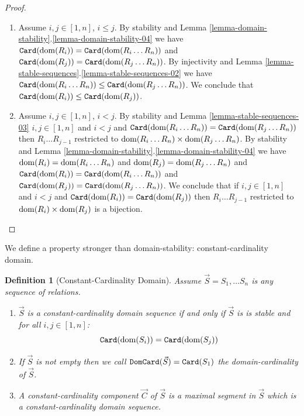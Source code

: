 \documentclass{lmcs}
\newtheorem{definition}[theorem]{Definition}
\begin{document}
\begin{proof}
\begin{enumerate}

\item
Assume $i,j \in [1,n]$, $i \le j$. By stability and
Lemma \ref{lemma-domain-stability}.\ref{lemma-domain-stability-04}
we have
${\tt Card}({\rm dom}(R_i)) = {\tt Card}({\rm dom}(R_i \ldots R_n))$ and
${\tt Card}({\rm dom}(R_j)) = {\tt Card}({\rm dom}(R_j \ldots R_n))$.
By injectivity and Lemma \ref{lemma-stable-sequences}.\ref{lemma-stable-sequences-02}  
we have 
${\tt Card}({\rm dom}(R_i \ldots R_n)) \le {\tt Card}({\rm dom}(R_j \ldots R_n))$.
We conclude that 
${\tt Card}({\rm dom}(R_i)) \le {\tt Card}({\rm dom}(R_j))$.

\item
Assume $i,j \in [1,n]$, $i < j$. By stability and Lemma \ref{lemma-stable-sequences-03}
$i, j \in[1,n]$ and $i < j$ and ${\tt Card}({\rm dom}(R_i \ldots R_n)) = {\tt Card}({\rm dom}(R_j \ldots R_n))$
then $R_i \ldots R_{j-1}$ restricted to ${\rm dom}(R_i \ldots R_n) \times {\rm dom}(R_j \ldots R_n)$.
By stability and
Lemma \ref{lemma-domain-stability}.\ref{lemma-domain-stability-04}
we have
${\rm dom}(R_i) = {\rm dom}(R_i \ldots R_n)$ and
${\rm dom}(R_j) = {\rm dom}(R_j \ldots R_n)$ and
${\tt Card}({\rm dom}(R_i)) = {\tt Card}({\rm dom}(R_i \ldots R_n))$ and
${\tt Card}({\rm dom}(R_j)) = {\tt Card}({\rm dom}(R_j \ldots R_n))$.
We conclude that if 
 $i, j \in[1,n]$ and $i < j$ and ${\tt Card}({\rm dom}(R_i)) = {\tt Card}({\rm dom}(R_j))$
then $R_i \ldots R_{j-1}$ restricted to ${\rm dom}(R_i) \times {\rm dom}(R_j)$
is a bijection.
\end{enumerate}

\end{proof}


We define a property stronger than domain-stability: constant-cardinality domain.


\begin{definition}[Constant-Cardinality Domain]
Assume $\vec{S}=S_1, \ldots S_n$ is any sequence of relations.
\begin{enumerate}

\item
$\vec{S}$ is a constant-cardinality domain sequence if and only if $\vec{S}$ is is stable
and for all $i,j \in [1,n]$:
$$
{\tt Card}({\rm dom}(S_i)) = {\tt Card}({\rm dom}(S_j))
$$

\item
If $\vec{S}$ is not empty then we call ${\tt DomCard}(\vec{S}) = {\tt Card}(S_1)$ 
the domain-cardinality of $\vec{S}$.

\item
A constant-cardinality component $\vec{C}$ of $\vec{S}$ is a maximal segment 
in $\vec{S}$ which is a constant-cardinality domain sequence.
\end{enumerate}
\end{definition}
\end{document}

